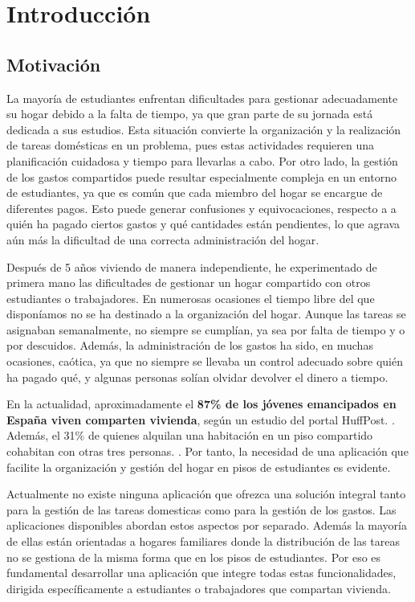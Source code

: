 \chapter{Introducción}
\label{cap:introduccion}




\section{Motivación}
\label{sec:motivacion}

La mayoría de estudiantes enfrentan dificultades para gestionar adecuadamente su hogar debido a la falta de tiempo, ya que gran parte de su jornada
está dedicada a sus estudios. Esta situación convierte la organización y la realización de tareas domésticas en un problema, pues estas actividades requieren 
una planificación cuidadosa y tiempo para llevarlas a cabo. Por otro lado, la gestión de los gastos compartidos puede resultar especialmente compleja en un entorno 
de estudiantes, ya que es común que cada miembro del hogar se encargue de diferentes pagos. Esto puede generar confusiones y equivocaciones, 
respecto a a quién ha pagado ciertos gastos y qué cantidades están pendientes, lo que agrava aún más la dificultad de una correcta
administración del hogar.

Después de 5 años viviendo de manera independiente, he experimentado de primera mano las dificultades de gestionar un hogar compartido con otros estudiantes o trabajadores. En numerosas ocasiones 
el tiempo libre del que disponíamos no se ha destinado a la organización del hogar. Aunque las tareas se asignaban semanalmente, no siempre se cumplían, ya sea
por falta de tiempo y o por descuidos. Además, la administración de los gastos ha sido, en muchas ocasiones, caótica, ya que no siempre se llevaba un control adecuado sobre quién ha pagado qué,
y algunas personas solían olvidar devolver el dinero a tiempo.  

En la actualidad, aproximadamente el \textbf{87\% de los jóvenes emancipados en España viven comparten vivienda}, según un estudio del portal HuffPost. \cite{huffpost2025}. Además, el 31\% de 
quienes alquilan una habitación en un piso compartido cohabitan con otras tres personas. \cite{ndp2024}. Por tanto, la necesidad de una aplicación que facilite la organización y gestión del hogar en pisos de estudiantes es evidente.

Actualmente no existe ninguna aplicación que ofrezca una solución integral tanto para la gestión de las tareas domesticas como para la gestión de los gastos. Las aplicaciones
disponibles abordan estos aspectos por separado. Además la mayoría de ellas están orientadas a hogares familiares donde la distribución de las tareas no se gestiona de la misma forma que 
en los pisos de estudiantes. Por eso es fundamental desarrollar una aplicación que integre todas estas funcionalidades, dirigida específicamente a estudiantes o trabajadores que compartan vivienda.

